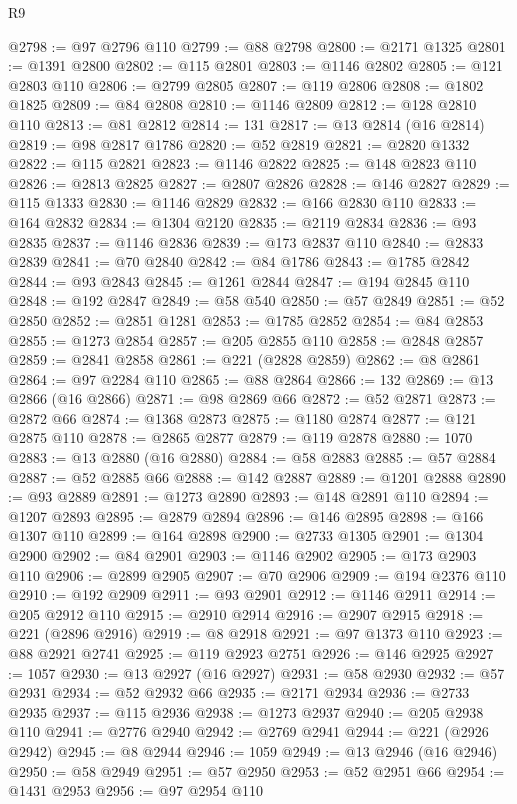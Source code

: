 \begin{lexlean}{R9}
\begin{coremodule}
@2798 := @97 @2796 @110
@2799 := @88 @2798
@2800 := @2171 @1325
@2801 := @1391 @2800
@2802 := @115 @2801
@2803 := @1146 @2802
@2805 := @121 @2803 @110
@2806 := @2799 @2805
@2807 := @119 @2806
@2808 := @1802 @1825
@2809 := @84 @2808
@2810 := @1146 @2809
@2812 := @128 @2810 @110
@2813 := @81 @2812
@2814 := 131
@2817 := @13 @2814 (@16 @2814)
@2819 := @98 @2817 @1786
@2820 := @52 @2819
@2821 := @2820 @1332
@2822 := @115 @2821
@2823 := @1146 @2822
@2825 := @148 @2823 @110
@2826 := @2813 @2825
@2827 := @2807 @2826
@2828 := @146 @2827
@2829 := @115 @1333
@2830 := @1146 @2829
@2832 := @166 @2830 @110
@2833 := @164 @2832
@2834 := @1304 @2120
@2835 := @2119 @2834
@2836 := @93 @2835
@2837 := @1146 @2836
@2839 := @173 @2837 @110
@2840 := @2833 @2839
@2841 := @70 @2840
@2842 := @84 @1786
@2843 := @1785 @2842
@2844 := @93 @2843
@2845 := @1261 @2844
@2847 := @194 @2845 @110
@2848 := @192 @2847
@2849 := @58 @540
@2850 := @57 @2849
@2851 := @52 @2850
@2852 := @2851 @1281
@2853 := @1785 @2852
@2854 := @84 @2853
@2855 := @1273 @2854
@2857 := @205 @2855 @110
@2858 := @2848 @2857
@2859 := @2841 @2858
@2861 := @221 (@2828 @2859)
@2862 := @8 @2861
@2864 := @97 @2284 @110
@2865 := @88 @2864
@2866 := 132
@2869 := @13 @2866 (@16 @2866)
@2871 := @98 @2869 @66
@2872 := @52 @2871
@2873 := @2872 @66
@2874 := @1368 @2873
@2875 := @1180 @2874
@2877 := @121 @2875 @110
@2878 := @2865 @2877
@2879 := @119 @2878
@2880 := 1070
@2883 := @13 @2880 (@16 @2880)
@2884 := @58 @2883
@2885 := @57 @2884
@2887 := @52 @2885 @66
@2888 := @142 @2887
@2889 := @1201 @2888
@2890 := @93 @2889
@2891 := @1273 @2890
@2893 := @148 @2891 @110
@2894 := @1207 @2893
@2895 := @2879 @2894
@2896 := @146 @2895
@2898 := @166 @1307 @110
@2899 := @164 @2898
@2900 := @2733 @1305
@2901 := @1304 @2900
@2902 := @84 @2901
@2903 := @1146 @2902
@2905 := @173 @2903 @110
@2906 := @2899 @2905
@2907 := @70 @2906
@2909 := @194 @2376 @110
@2910 := @192 @2909
@2911 := @93 @2901
@2912 := @1146 @2911
@2914 := @205 @2912 @110
@2915 := @2910 @2914
@2916 := @2907 @2915
@2918 := @221 (@2896 @2916)
@2919 := @8 @2918
@2921 := @97 @1373 @110
@2923 := @88 @2921 @2741
@2925 := @119 @2923 @2751
@2926 := @146 @2925
@2927 := 1057
@2930 := @13 @2927 (@16 @2927)
@2931 := @58 @2930
@2932 := @57 @2931
@2934 := @52 @2932 @66
@2935 := @2171 @2934
@2936 := @2733 @2935
@2937 := @115 @2936
@2938 := @1273 @2937
@2940 := @205 @2938 @110
@2941 := @2776 @2940
@2942 := @2769 @2941
@2944 := @221 (@2926 @2942)
@2945 := @8 @2944
@2946 := 1059
@2949 := @13 @2946 (@16 @2946)
@2950 := @58 @2949
@2951 := @57 @2950
@2953 := @52 @2951 @66
@2954 := @1431 @2953
@2956 := @97 @2954 @110

\end{coremodule}
\end{lexlean}
